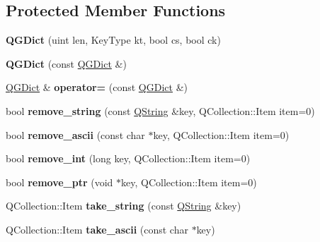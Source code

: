 \subsection*{Protected Member Functions}
\begin{DoxyCompactItemize}
\item 
\mbox{\label{class_q_g_dict_a9dd35b06699b4527dd7e66d1b962b475}} 
{\bfseries Q\+G\+Dict} (uint len, Key\+Type kt, bool cs, bool ck)
\item 
\mbox{\label{class_q_g_dict_a137d355f22abdcbda8ded8b8736ec117}} 
{\bfseries Q\+G\+Dict} (const \mbox{\hyperlink{class_q_g_dict}{Q\+G\+Dict}} \&)
\item 
\mbox{\label{class_q_g_dict_a8c4e70b0dee22ada9bf8a41e3c92280d}} 
\mbox{\hyperlink{class_q_g_dict}{Q\+G\+Dict}} \& {\bfseries operator=} (const \mbox{\hyperlink{class_q_g_dict}{Q\+G\+Dict}} \&)
\item 
\mbox{\label{class_q_g_dict_a50cd12c84c03da6cd92d413908d1a001}} 
bool {\bfseries remove\+\_\+string} (const \mbox{\hyperlink{class_q_string}{Q\+String}} \&key, Q\+Collection\+::\+Item item=0)
\item 
\mbox{\label{class_q_g_dict_a65224d18f945fa28a1300526fd4b5903}} 
bool {\bfseries remove\+\_\+ascii} (const char $\ast$key, Q\+Collection\+::\+Item item=0)
\item 
\mbox{\label{class_q_g_dict_a32023e3d50d6f8b81935655b66f0bdc4}} 
bool {\bfseries remove\+\_\+int} (long key, Q\+Collection\+::\+Item item=0)
\item 
\mbox{\label{class_q_g_dict_abc3fd70fe1c1f6523e3ce4258672a4ca}} 
bool {\bfseries remove\+\_\+ptr} (void $\ast$key, Q\+Collection\+::\+Item item=0)
\item 
\mbox{\label{class_q_g_dict_a17b54499d2315700966df4ad58381b79}} 
Q\+Collection\+::\+Item {\bfseries take\+\_\+string} (const \mbox{\hyperlink{class_q_string}{Q\+String}} \&key)
\item 
\mbox{\label{class_q_g_dict_a63d62bbf56ae87af66f3c6c61b8c5bf7}} 
Q\+Collection\+::\+Item {\bfseries take\+\_\+ascii} (const char $\ast$key)

\end{DoxyCompactItemize}
